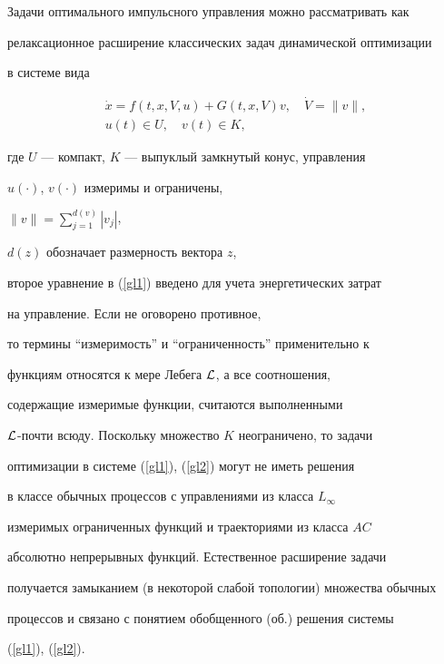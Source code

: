 Задачи оптимального импульсного управления можно рассматривать как


релаксационное расширение классических задач динамической оптимизации


в системе вида


\begin{gather}


\Dot{x}=f(t,x,V,u)+G(t,x,V)v, \quad


\Dot{V}=\|v\|, \label{gl1} \\


%


u(t) \in U,\quad v(t) \in K, \label{gl2}


\end{gather}


где $U$ --- компакт, $K$ --- выпуклый замкнутый конус, управления


$u(\cdot)$, $v(\cdot)$ измеримы и ограничены,


$\|v\|=\sum\limits_{j=1}^{d(v)}|v_j|$,


$d(z)$ обозначает размерность вектора $z$,


второе уравнение в (\ref{gl1}) введено для учета энергетических затрат


на управление. Если не оговорено противное,


то термины ``измеримость'' и ``ограниченность'' применительно к


функциям относятся к мере Лебега ${\cal L}$, а все соотношения,


содержащие измеримые функции, считаются выполненными


${\cal L}$-почти всюду. Поскольку множество $K$ неограничено, то задачи


оптимизации в системе (\ref{gl1}), (\ref{gl2}) могут не иметь решения


в классе обычных процессов с управлениями из класса $L_{\infty}$


измеримых ограниченных функций и траекториями из класса $AC$


абсолютно непрерывных функций. Естественное расширение задачи


получается замыканием (в некоторой слабой топологии) множества обычных


процессов и связано с понятием обобщенного (об.) решения системы


(\ref{gl1}), (\ref{gl2}).





